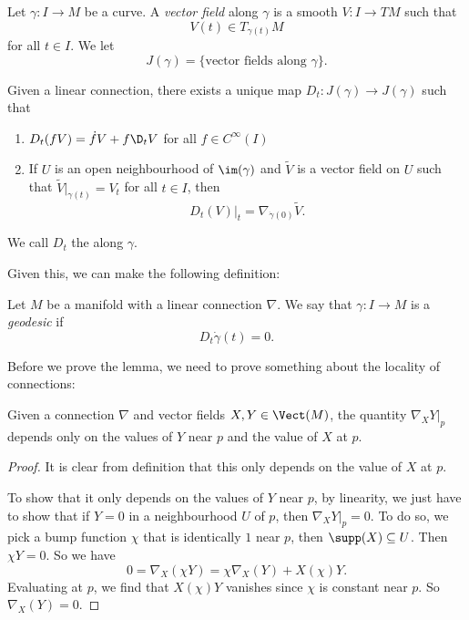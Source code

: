 \documentclass[a4paper]{article}
\begin{document}
Let $\gamma: I \to M$ be a curve. A \emph{vector field} along $\gamma$ is a smooth $V: I \to TM$ such that
\[
  V(t) \in T_{\gamma(t)} M
\]
for all $t \in I$. We let
\[
  J(\gamma) = \{\text{vector fields along $\gamma$}\}.
\]
\begin{lemma}
  Given a linear connection, there exists a unique map $D_t: J(\gamma) \to J(\gamma)$ such that
  \begin{enumerate}
    \item $D_t(fV) = \dot{f} V + f \D_t V$ for all $f \in C^\infty(I)$
    \item If $U$ is an open neighbourhood of $\im(\gamma)$ and $\tilde{V}$ is a vector field on $U$ such that $\tilde{V}|_{\gamma(t)} = V_t$ for all $t \in I$, then
      \[
        D_t(V)|_t = \nabla_{\dot{\gamma}(0)} \tilde{V}.
      \]
  \end{enumerate}
  We call $D_t$ the  along $\gamma$.
\end{lemma}

Given this, we can make the following definition:
\begin{defi}[Geodesic]
  Let $M$ be a manifold with a linear connection $\nabla$. We say that $\gamma: I \to M$ is a \emph{geodesic} if
  \[
    D_t \dot{\gamma}(t) = 0.
  \]
\end{defi}

Before we prove the lemma, we need to prove something about the locality of connections:
\begin{lemma}
  Given a connection $\nabla$ and vector fields $X, Y \in \Vect(M)$, the quantity $\nabla_X Y|_p$ depends only on the values of $Y$ near $p$ and the value of $X$ at $p$.
\end{lemma}

\begin{proof}
  It is clear from definition that this only depends on the value of $X$ at $p$.

  To show that it only depends on the values of $Y$ near $p$, by linearity, we just have to show that if $Y = 0$ in a neighbourhood $U$ of $p$, then $\nabla_X Y|_p = 0$. To do so, we pick a bump function $\chi$ that is identically $1$ near $p$, then $\supp(X) \subseteq U$. Then $\chi Y = 0$. So we have
  \[
    0 = \nabla_X (\chi Y) = \chi \nabla_X(Y) + X(\chi) Y.
  \]
  Evaluating at $p$, we find that $X(\chi) Y$ vanishes since $\chi$ is constant near $p$. So $\nabla_X(Y) = 0$.
\end{proof}
\end{document}
